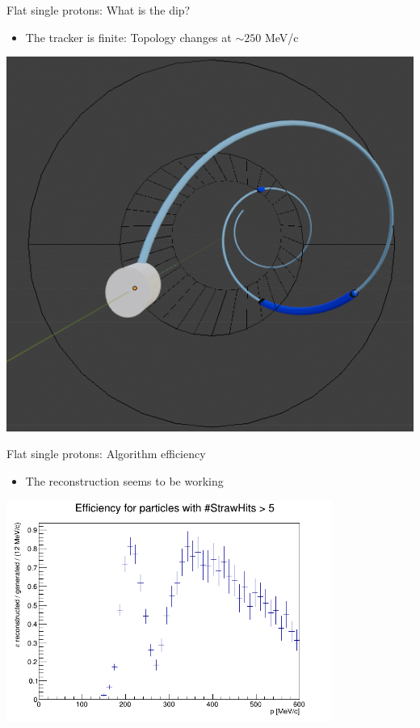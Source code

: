 \documentclass[10pt]{beamer}
\begin{document}
%
\begin{frame}{Flat single protons: What is the dip?}
\begin{itemize}
\item The tracker is finite: Topology changes at $\sim 250$ MeV/c
\end{itemize}
\begin{center}
\includegraphics[scale=0.7]{Blender_Tracker_4}
\end{center}
\end{frame}

%
\begin{frame}{Flat single protons: Algorithm efficiency}
\begin{itemize}
\item The reconstruction seems to be working
\end{itemize}
\begin{center}
\includegraphics[width=0.8\textwidth]{plots/flat/Lambda_eff_trk0-5hits}
\end{center}
\end{frame}
\end{document}
